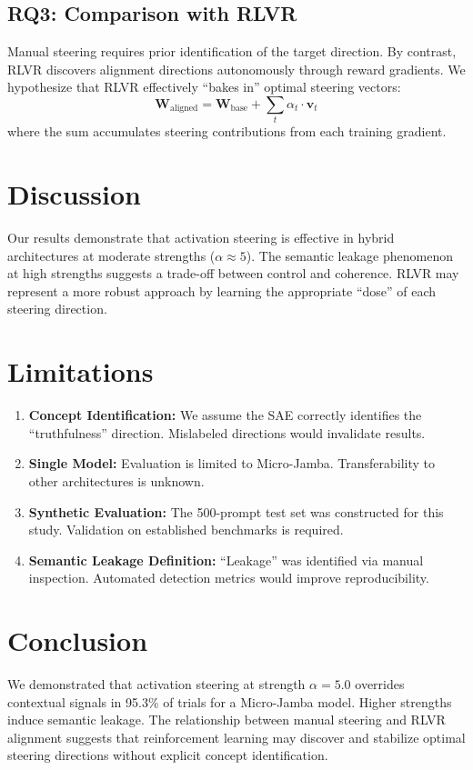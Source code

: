 \documentclass{article}
\begin{document}
\subsection{RQ3: Comparison with RLVR}
Manual steering requires prior identification of the target direction. By contrast, RLVR discovers alignment directions autonomously through reward gradients. We hypothesize that RLVR effectively ``bakes in'' optimal steering vectors:
\begin{equation}
    \mathbf{W}_{\text{aligned}} = \mathbf{W}_{\text{base}} + \sum_t \alpha_t \cdot \mathbf{v}_t
    \label{eq:rlvr_steering}
\end{equation}
where the sum accumulates steering contributions from each training gradient.

\section{Discussion}
Our results demonstrate that activation steering is effective in hybrid architectures at moderate strengths ($\alpha \approx 5$). The semantic leakage phenomenon at high strengths suggests a trade-off between control and coherence. RLVR may represent a more robust approach by learning the appropriate ``dose'' of each steering direction.

\section{Limitations}
\begin{enumerate}
    \item \textbf{Concept Identification:} We assume the SAE correctly identifies the ``truthfulness'' direction. Mislabeled directions would invalidate results.
    \item \textbf{Single Model:} Evaluation is limited to Micro-Jamba. Transferability to other architectures is unknown.
    \item \textbf{Synthetic Evaluation:} The 500-prompt test set was constructed for this study. Validation on established benchmarks is required.
    \item \textbf{Semantic Leakage Definition:} ``Leakage'' was identified via manual inspection. Automated detection metrics would improve reproducibility.
\end{enumerate}

\section{Conclusion}
We demonstrated that activation steering at strength $\alpha=5.0$ overrides contextual signals in 95.3\% of trials for a Micro-Jamba model. Higher strengths induce semantic leakage. The relationship between manual steering and RLVR alignment suggests that reinforcement learning may discover and stabilize optimal steering directions without explicit concept identification.
\end{document}
